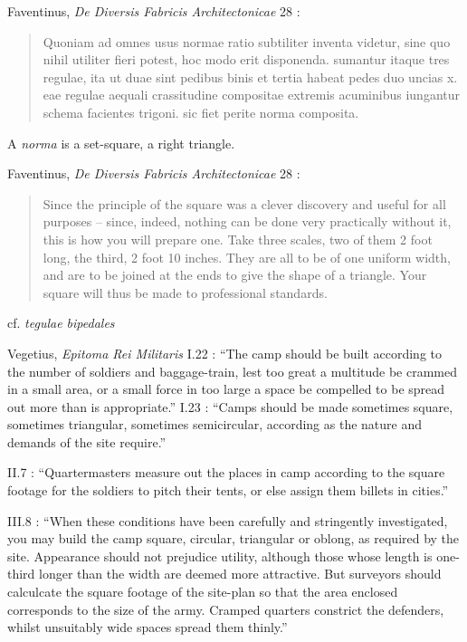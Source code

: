Faventinus, {\em De Diversis Fabricis Architectonicae} 28 \cite[p.~80]{plommer}:

\begin{quote}
Quoniam ad omnes usus normae ratio subtiliter inventa videtur, sine quo nihil utiliter fieri potest, hoc modo erit disponenda. sumantur itaque tres regulae, ita ut duae
sint pedibus binis et tertia habeat pedes duo uncias x. eae regulae aequali crassitudine compositae extremis acuminibus iungantur schema facientes trigoni. sic
fiet perite norma composita.
\end{quote}

A {\em norma} is a set-square, a right triangle.

Faventinus, {\em De Diversis Fabricis Architectonicae} 28 \cite[p.~81]{plommer}:

\begin{quote}
Since the principle of the square was a clever discovery and useful for all purposes -- since, indeed, nothing can be done very practically without it,
this is how you will prepare one. Take three scales, two of them 2 foot long, the third, 2 foot 10 inches. They are all to be of one uniform width, and are to be joined
at the ends to give the shape of a triangle. Your square will thus be made to professional standards.
\end{quote}

cf. {\em tegulae bipedales}

Vegetius, {\em Epitoma Rei Militaris} 
I.22 \cite[p.~24]{vegetius}: ``The camp should be built according to the number of soldiers and baggage-train, lest too great
a multitude be crammed in a small area, or a small force in too large a space be compelled to be spread
out more than is appropriate.''
I.23 \cite[p.~24]{vegetius}: ``Camps should be made sometimes square, sometimes triangular,
sometimes semicircular, according as the nature and demands of the site require.''

II.7 \cite[pp.~38--39]{vegetius}: ``Quartermasters measure out the places in camp according to the square footage
for the soldiers to pitch their tents, or else assign them billets in cities.''

III.8 \cite[p.~80]{vegetius}: ``When these conditions have been carefully and stringently investigated, you may build
the camp square, circular, triangular or oblong, as required by the site. Appearance should not prejudice utility, although those
whose length is one-third longer than the width are deemed more attractive. But surveyors should calculcate
the square footage of the site-plan so that the area enclosed corresponds to the size of the army. Cramped quarters
constrict the defenders, whilst unsuitably wide spaces spread them thinly.''

